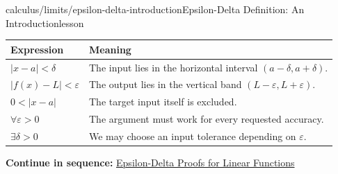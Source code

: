 \documentclass[11pt,openany]{book}
\theoremstyle{bgplain}
\newcommand{\webnext}[2]{%
  \par\addvspace{1.2em}\noindent{\color{BGLine}\rule{\textwidth}{0.35pt}}\par\smallskip
  {\small\color{BGGray}\textbf{Continue in sequence:} \hyperlink{web:#1}{#2}}\par
}
\newcommand{\eps}{\varepsilon}
\begin{document}
\begin{webpage}{calculus/limits/epsilon-delta-introduction}{Epsilon-Delta Definition: An Introduction}{lesson}
\begin{center}
\begin{tabularx}{0.9\textwidth}{@{}p{}X@{}}
\toprule
\textbf{Expression} & \textbf{Meaning}\\
\midrule
\(|x-a|<\delta\) & The input lies in the horizontal interval \((a-\delta,a+\delta)\).\\
\(|f(x)-L|<\eps\) & The output lies in the vertical band \((L-\eps,L+\eps)\).\\
\(0<|x-a|\) & The target input itself is excluded.\\
\(\forall\eps>0\) & The argument must work for every requested accuracy.\\
\(\exists\delta>0\) & We may choose an input tolerance depending on \(\eps\).\\
\bottomrule
\end{tabularx}
\end{center}
\webnext{calculus/limits/epsilon-delta-linear}{Epsilon-Delta Proofs for Linear Functions}
\end{webpage}
\end{document}
